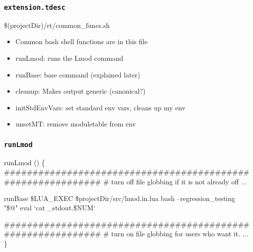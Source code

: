 \documentclass{beamer}
\begin{document}
\begin{frame}[fragile]
  \frametitle{\texttt{extension.tdesc}}
    {\tiny
{}
    }
\end{frame}

\begin{frame}{\$(projectDir)/rt/common\_funcs.sh}
  \begin{itemize}
    \item Common bash shell functions are in this file
    \item runLmod: runs the Lmod command 
    \item runBase: base command (explained later)
    \item cleanup: Makes output generic (canonical?)
    \item initStdEnvVars: set standard env vars, cleans up my env
    \item unsetMT: remove moduletable from env
  \end{itemize}
\end{frame}

\begin{frame}[fragile]
  \frametitle{\texttt{runLmod}}
    {\tiny
\begin{semiverbatim}
runLmod ()
\{
   ############################################################
   # turn off file globbing if it is not already off
   ...

   runBase \$LUA\_EXEC \$projectDir/src/lmod.in.lua bash --regression\_testing "\$@"
   eval `cat \_stdout.\$NUM`

   ############################################################
   # turn on file globbing for users who want it.
   ...
\}
\end{semiverbatim}
    }
\end{frame}
\end{document}
